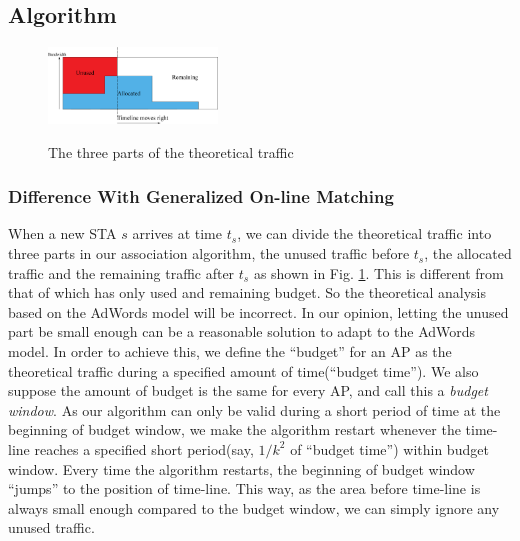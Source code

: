\documentclass[conference]{IEEEtran}
\def\figwidth{0.4\textwidth}
\begin{document}
  \subsection{Algorithm}
 \begin{figure}[!ht]
    \centering
    \includegraphics[width=\figwidth]{Three_parts.eps}\\
    \caption{The three parts of the theoretical traffic}\label{fig:Three_parts}
  \end{figure}

  \subsubsection{Difference With Generalized On-line Matching}
  When a new STA $s$ arrives at time $t_s$, we can divide the theoretical traffic into three parts in our association algorithm, the unused traffic before $t_s$, the allocated traffic and the remaining traffic after $t_s$ as shown in Fig. \ref{fig:Three_parts}. This is different from that of \cite{Mehta:2007} which has only used and remaining budget. So the theoretical analysis based on the AdWords model will be incorrect. In our opinion, letting the unused part be small enough can be a reasonable solution to  adapt to the AdWords model. In order to achieve this, we define the ``budget'' for an AP as the theoretical traffic during a specified amount of time(``budget time''). We also suppose the amount of budget is the same for every AP, and call this a \emph{budget window}. As our algorithm can only be valid during a short period of time at the beginning of budget window, we make the algorithm restart whenever the time-line reaches a specified short period(say, $1/k^2$ of ``budget time'') within budget window. Every time the algorithm restarts, the beginning of budget window ``jumps'' to the position of time-line. This way, as the area before time-line is always small enough compared to the budget window, we can simply ignore any unused traffic.
\end{document}
